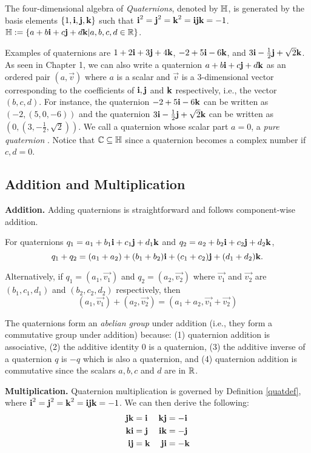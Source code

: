 \begin{definition}[Quaternion] \label{quatdef}
	\cite{stamaria} The four-dimensional algebra of \emph{Quaternions}, denoted by $\operatorname{\mathbb{H}}$, is generated by the basis elements $\{1,\textbf{i},\textbf{j},\textbf{k}\}$ such that $\textbf{i}^2 = \textbf{j}^2 = \textbf{k}^2 = \textbf{i} \textbf{j} \textbf{k} = -1$. $\operatorname{\mathbb{H}} := \{a + b\textbf{i} + c\textbf{j} + d\textbf{k} | a,b,c,d \in \operatorname{\mathbb{R}}\}$. 
\end{definition}

Examples of quaternions are $1+2\textbf{i}+3\textbf{j}+4\textbf{k}$, $-2+5\textbf{i}-6\textbf{k}$, and $3\textbf{i}-\frac{1}{2}\textbf{j}+\sqrt{2}\textbf{k}$. As seen in Chapter 1, we can also write a quaternion $a + b\textbf{i} + c\textbf{j} + d\textbf{k}$ as an ordered pair $(a,\vec{v})$ where $a$ is a scalar and $\vec{v}$ is a 3-dimensional vector corresponding to the coefficients of $\textbf{i}, \textbf{j}$ and $\textbf{k}$ respectively, i.e., the vector $(b,c,d)$. For instance, the quaternion $-2+5\textbf{i}-6\textbf{k}$ can be written as $(-2,(5,0,-6))$ and the quaternion $3\textbf{i}-\frac{1}{2}\textbf{j}+\sqrt{2}\textbf{k}$ can be written as $(0,(3,-\frac{1}{2},\sqrt{2}))$. We call a quaternion whose scalar part $a = 0$, a \emph{pure quaternion} \cite{lerios} \cite{mathoma}. Notice that $\operatorname{\mathbb{C}} \subseteq \operatorname{\mathbb{H}}$ since a quaternion becomes a complex number if $c,d = 0$.

\subsection{Addition and Multiplication}

\textbf{Addition.} Adding quaternions is straightforward and follows component-wise addition.
\begin{definition} \label{quatp}
 \cite{lerios} For quaternions $q_1 = a_1 + b_1\textbf{i} + c_1\textbf{j} + d_1\textbf{k}$ and $q_2 = a_2 + b_2\textbf{i} + c_2\textbf{j} + d_2\textbf{k}$, $$q_1+q_2 = (a_1+a_2) + (b_1+b_2)\textbf{i} + (c_1+c_2)\textbf{j} + (d_1+d_2)\textbf{k}.$$ 
\end{definition}
Alternatively, if $q_1 = (a_1,\vec{v_1})$ and $q_2 = (a_2,\vec{v_2})$ where $\vec{v_1}$ and $\vec{v_2}$ are $(b_1,c_1,d_1)$ and $(b_2,c_2,d_2)$ respectively, then $$(a_1,\vec{v_1})+(a_2,\vec{v_2}) = (a_1+a_2,\vec{v_1}+\vec{v_2})$$ 

The quaternions form an \emph{abelian group} under addition (i.e., they form a commutative group under addition) because: (1) quaternion addition is associative, (2) the additive identity 0 is a quaternion, (3) the additive inverse of a quaternion $q$ is $-q$ which is also a quaternion, and (4) quaternion addition is commutative since the scalars $a,b,c$ and $d$ are in $\operatorname{\mathbb{R}}$. 

\noindent\textbf{Multiplication.} Quaternion multiplication is governed by Definition \ref{quatdef}, where $\textbf{i}^2 = \textbf{j}^2 = \textbf{k}^2 = \textbf{i} \textbf{j} \textbf{k} = -1$. We can then derive the following: 
\begin{align*} 
	\textbf{j}\textbf{k} &= \textbf{i} & \textbf{k}\textbf{j} &= -\textbf{i} \\
	\textbf{k}\textbf{i} &= \textbf{j} & \textbf{i}\textbf{k} &= -\textbf{j} \\
	\textbf{i}\textbf{j} &= \textbf{k} & \textbf{j}\textbf{i} &= -\textbf{k}
\end{align*}

